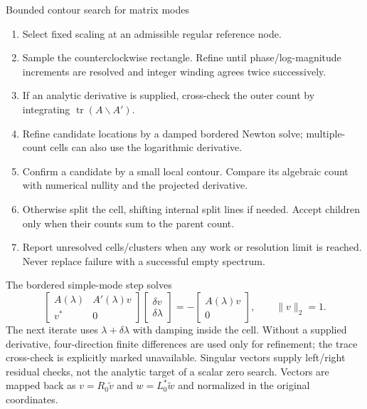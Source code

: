 \begin{algobox}{Bounded contour search for matrix modes}
\begin{enumerate}
 \item Select fixed scaling at an admissible regular reference node.
 \item Sample the counterclockwise rectangle. Refine until phase/log-magnitude
       increments are resolved and integer winding agrees twice successively.
 \item If an analytic derivative is supplied, cross-check the outer count
       by integrating $\operatorname{tr}(A\backslash A')$.
 \item Refine candidate locations by a damped bordered Newton solve;
       multiple-count cells can also use the logarithmic derivative.
 \item Confirm a candidate by a small local contour. Compare its algebraic
       count with numerical nullity and the projected derivative.
 \item Otherwise split the cell, shifting internal split lines if needed.
       Accept children only when their counts sum to the parent count.
 \item Report unresolved cells/clusters when any work or resolution limit
       is reached. Never replace failure with a successful empty spectrum.
\end{enumerate}
\end{algobox}

The bordered simple-mode step solves
\begin{equation}
 \begin{bmatrix}A(\lambda)&A'(\lambda)v\\v^*&0\end{bmatrix}
 \begin{bmatrix}\delta v\\\delta\lambda\end{bmatrix}
 =-\begin{bmatrix}A(\lambda)v\\0\end{bmatrix},\qquad \|v\|_2=1.
\end{equation}
The next iterate uses $\lambda+\delta\lambda$ with damping inside the cell.
Without a supplied derivative, four-direction finite differences are used
only for refinement; the trace cross-check is explicitly marked unavailable.
Singular vectors supply left/right residual checks, not the analytic target
of a scalar zero search. Vectors are mapped back as $v=R_0\widetilde v$ and
$w=L_0^*\widetilde w$ and normalized in the original coordinates.

